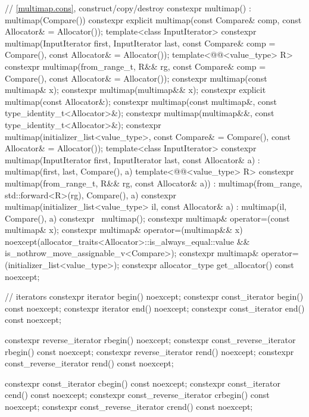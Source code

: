 \begin{codeblock}
{{    // \ref{multimap.cons}, construct/copy/destroy
    constexpr multimap() : multimap(Compare()) { }
    constexpr explicit multimap(const Compare& comp, const Allocator& = Allocator());
    template<class InputIterator>
      constexpr multimap(InputIterator first, InputIterator last,
                         const Compare& comp = Compare(), const Allocator& = Allocator());
    template<@@<value_type> R>
      constexpr multimap(from_range_t, R&& rg,
                         const Compare& comp = Compare(), const Allocator& = Allocator());
    constexpr multimap(const multimap& x);
    constexpr multimap(multimap&& x);
    constexpr explicit multimap(const Allocator&);
    constexpr multimap(const multimap&, const type_identity_t<Allocator>&);
    constexpr multimap(multimap&&, const type_identity_t<Allocator>&);
    constexpr multimap(initializer_list<value_type>,
                       const Compare& = Compare(), const Allocator& = Allocator());
    template<class InputIterator>
      constexpr multimap(InputIterator first, InputIterator last, const Allocator& a)
        : multimap(first, last, Compare(), a) { }
    template<@@<value_type> R>
      constexpr multimap(from_range_t, R&& rg, const Allocator& a))
        : multimap(from_range, std::forward<R>(rg), Compare(), a) { }
    constexpr multimap(initializer_list<value_type> il, const Allocator& a)
      : multimap(il, Compare(), a) { }
    constexpr ~multimap();
    constexpr multimap& operator=(const multimap& x);
    constexpr multimap& operator=(multimap&& x)
      noexcept(allocator_traits<Allocator>::is_always_equal::value &&
               is_nothrow_move_assignable_v<Compare>);
    constexpr multimap& operator=(initializer_list<value_type>);
    constexpr allocator_type get_allocator() const noexcept;

    // iterators
    constexpr iterator               begin() noexcept;
    constexpr const_iterator         begin() const noexcept;
    constexpr iterator               end() noexcept;
    constexpr const_iterator         end() const noexcept;

    constexpr reverse_iterator       rbegin() noexcept;
    constexpr const_reverse_iterator rbegin() const noexcept;
    constexpr reverse_iterator       rend() noexcept;
    constexpr const_reverse_iterator rend() const noexcept;

    constexpr const_iterator         cbegin() const noexcept;
    constexpr const_iterator         cend() const noexcept;
    constexpr const_reverse_iterator crbegin() const noexcept;
    constexpr const_reverse_iterator crend() const noexcept;

}}
\end{codeblock}
